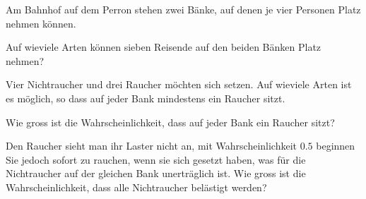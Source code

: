 Am Bahnhof auf dem Perron stehen zwei Bänke, auf denen je vier
Personen Platz nehmen können.
\begin{teilaufgaben}
\item
Auf wieviele Arten können sieben Reisende auf den beiden Bänken Platz
nehmen?
\item
Vier Nichtraucher und drei Raucher möchten sich setzen.
Auf wieviele Arten ist es möglich, so dass auf jeder Bank mindestens
ein Raucher sitzt.
\item
Wie gross ist die Wahrscheinlichkeit, dass auf jeder Bank ein Raucher
sitzt?
\item
Den Raucher sieht man ihr Laster nicht an, mit Wahrscheinlichkeit $0.5$
beginnen Sie jedoch sofort zu rauchen, wenn sie sich gesetzt haben, was
für die Nichtraucher auf der gleichen Bank unerträglich ist.
Wie gross ist die Wahrscheinlichkeit, dass alle Nichtraucher belästigt
werden?
\end{teilaufgaben}


